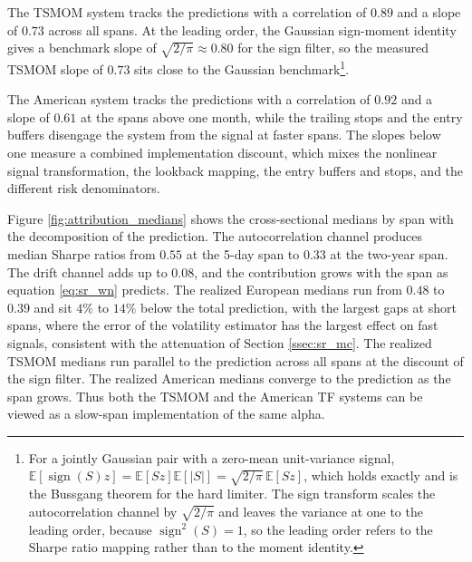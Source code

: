 \documentclass[hidelinks]{siamonline250211}
\DeclareMathOperator{\sgn}{sign}
\begin{document}
The TSMOM system tracks the predictions with a correlation of $0.89$ and a slope of $0.73$ across all spans. At the leading order, the Gaussian sign-moment identity gives a benchmark slope of $\sqrt{2/\pi}\approx 0.80$ for the sign filter, so the measured TSMOM slope of $0.73$ sits close to the Gaussian benchmark\footnote{For a jointly Gaussian pair with a zero-mean unit-variance signal, $\mathbb{E}\left[\sgn\left(S\right)z\right]=\mathbb{E}\left[Sz\right]\mathbb{E}\left[\left|S\right|\right]=\sqrt{2/\pi}\,\mathbb{E}\left[Sz\right]$, which holds exactly and is the Bussgang theorem for the hard limiter. The sign transform scales the autocorrelation channel by $\sqrt{2/\pi}$ and leaves the variance at one to the leading order, because $\sgn^{2}\left(S\right)=1$, so the leading order refers to the Sharpe ratio mapping rather than to the moment identity.}.

The American system tracks the predictions with a correlation of $0.92$ and a slope of $0.61$ at the spans above one month, while the trailing stops and the entry buffers disengage the system from the signal at faster spans. The slopes below one measure a combined implementation discount, which mixes the nonlinear signal transformation, the lookback mapping, the entry buffers and stops, and the different risk denominators.


Figure \ref{fig:attribution_medians} shows the cross-sectional medians by span with the decomposition of the prediction. The autocorrelation channel produces median Sharpe ratios from $0.55$ at the 5-day span to $0.33$ at the two-year span. The drift channel adds up to $0.08$, and the contribution grows with the span as equation \eqref{eq:sr_wn} predicts. The realized European medians run from $0.48$ to $0.39$ and sit $4\%$ to $14\%$ below the total prediction, with the largest gaps at short spans, where the error of the volatility estimator has the largest effect on fast signals, consistent with the attenuation of Section \ref{ssec:sr_mc}. The realized TSMOM medians run parallel to the prediction across all spans at the discount of the sign filter. The realized American medians converge to the prediction as the span grows. Thus both the TSMOM and the American TF systems can be viewed as a slow-span implementation of the same alpha. 
\end{document}
